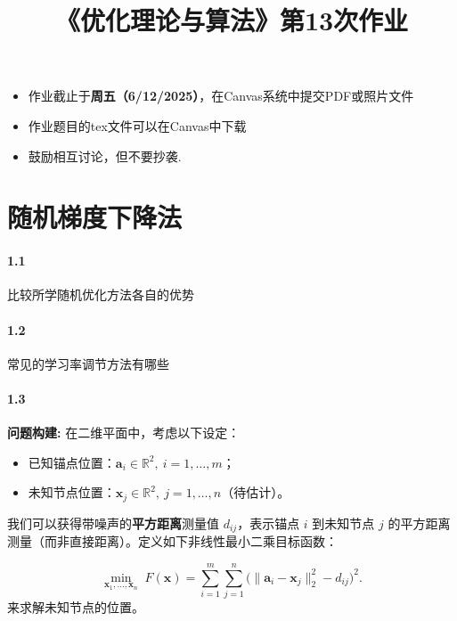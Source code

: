 \documentclass[12pt,a4paper]{article}
\begin{document}
\title{
{《优化理论与算法》第13次作业
}
}
\date{}


\maketitle
\begin{itemize}
	\item 作业截止于{\bf 周五（6/12/2025）}，在Canvas系统中提交PDF或照片文件
	\item 作业题目的tex文件可以在Canvas中下载
	\item 鼓励相互讨论，但不要抄袭.
\end{itemize}

\section{随机梯度下降法}

\paragraph{1.1} 比较所学随机优化方法各自的优势

\paragraph{1.2} 常见的学习率调节方法有哪些

\paragraph{1.3}
\textbf{问题构建:} 在二维平面中，考虑以下设定：
\begin{itemize}
    \item 已知锚点位置：$\mathbf{a}_i \in \mathbb{R}^2,\ i=1,\dots,m$；
    \item 未知节点位置：$\mathbf{x}_j \in \mathbb{R}^2,\ j=1,\dots,n$（待估计）。
\end{itemize}

我们可以获得带噪声的\textbf{平方距离}测量值 $d_{ij}$，表示锚点 $i$ 到未知节点 $j$ 的平方距离测量（而非直接距离）。定义如下非线性最小二乘目标函数：

\[
\min_{\mathbf{x}_1,\dots,\mathbf{x}_n} \; F(\mathbf{x}) = \sum_{i=1}^{m}\sum_{j=1}^{n} \bigl( \|\mathbf{a}_i - \mathbf{x}_j\|_2^2 - d_{ij} \bigr)^2 .
\]
来求解未知节点的位置。
\end{document}
